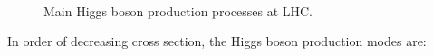 \begin{figure}[htb]
\centering
{}
\\
\caption{Main Higgs boson production processes at LHC.}\label{fig:higgs_prod}
\end{figure}

In order of decreasing cross section, the Higgs boson production modes are:

